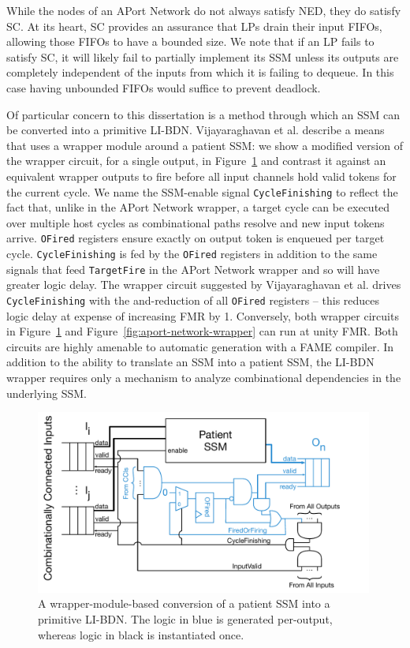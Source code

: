 While the nodes of an APort Network do not always satisfy NED, they do satisfy
SC. At its heart, SC provides an assurance that LPs drain their input FIFOs,
allowing those FIFOs to have a bounded size. We note that if an LP fails to satisfy
SC, it will likely fail to partially implement its SSM unless its outputs are
completely independent of the inputs from which it is failing to dequeue. In
this case having unbounded FIFOs would suffice to prevent deadlock.

Of particular concern to this dissertation is a method through which an SSM can
be converted into a primitive LI-BDN.  Vijayaraghavan et al. describe a means
that uses a wrapper module around a patient SSM: we show a modified version of the wrapper circuit, for a
single output, in Figure~\ref{fig:libdn-wrapper} and contrast it against an equivalent wrapper
outputs to fire before all input channels hold valid tokens for the current cycle. We name the SSM-enable signal \texttt{CycleFinishing}
to reflect the fact that, unlike in the APort Network wrapper, a target cycle can be executed over multiple host cycles
as combinational paths resolve and new input tokens arrive. \texttt{OFired} registers ensure exactly on output
token is enqueued per target cycle. \texttt{CycleFinishing} is fed by the \texttt{OFired} registers in addition to the same signals that feed
\texttt{TargetFire} in the APort Network wrapper and so will have greater logic delay. The wrapper circuit
suggested by Vijayaraghavan et al. drives \texttt{CycleFinishing} with the and-reduction of all \texttt{OFired}
registers -- this reduces logic delay at expense of increasing FMR by 1. Conversely, both wrapper
circuits in Figure~\ref{fig:libdn-wrapper} and Figure~\ref{fig:aport-network-wrapper} can run at unity FMR.
Both circuits are highly amenable to automatic generation with a FAME compiler.
In addition to the ability to translate an SSM into a patient SSM, the LI-BDN wrapper requires
only a mechanism to analyze combinational dependencies in the underlying SSM.

\begin{figure}
    \centering
    \includegraphics[width=0.99\textwidth]{figures/libdn-wrapper.pdf}
    \caption{A wrapper-module-based conversion of a patient SSM into a primitive LI-BDN. The logic in blue
    is generated per-output, whereas logic in black is instantiated once.}
    \label{fig:libdn-wrapper}
\end{figure}

